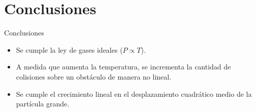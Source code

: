 \section{Conclusiones}\label{sec:conclusiones}

\begin{frame}{Conclusiones}
    \begin{itemize}
        \item Se cumple la ley de gases ideales ($P \propto T$).
        \item A medida que aumenta la temperatura, se incrementa la cantidad de colisiones sobre un obstáculo de manera no lineal.
        \item Se cumple el crecimiento lineal en el desplazamiento cuadrático medio de la partícula grande.
    \end{itemize}
\end{frame}

